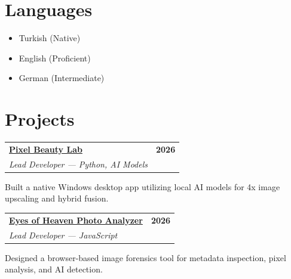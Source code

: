 \documentclass[a4paper,12pt]{article}
\begin{document}
\vspace{10pt}

\section{Languages}
\begin{itemize}[nosep,after=\strut, leftmargin=1.5em, itemsep=6pt,label=\textbullet]
    \item Turkish (Native)
    \item English (Proficient)
    \item German (Intermediate)
\end{itemize}

\newpage

\section{Projects}
\begin{tabularx}{\linewidth}{@{}X r@{}}
\underline{\textbf{Pixel Beauty Lab}} & \textbf{2026} \\
\textit{Lead Developer --- Python, AI Models} & \\
\end{tabularx}
\vspace{-16pt}

{\footnotesize\color{black!60} Built a native Windows desktop app utilizing local AI models for 4x image upscaling and hybrid fusion.}

\vspace{10pt}

\begin{tabularx}{\linewidth}{@{}X r@{}}
\underline{\textbf{Eyes of Heaven Photo Analyzer}} & \textbf{2026} \\
\textit{Lead Developer --- JavaScript} & \\
\end{tabularx}
\vspace{-16pt}

{\footnotesize\color{black!60} Designed a browser-based image forensics tool for metadata inspection, pixel analysis, and AI detection.}
\end{document}
